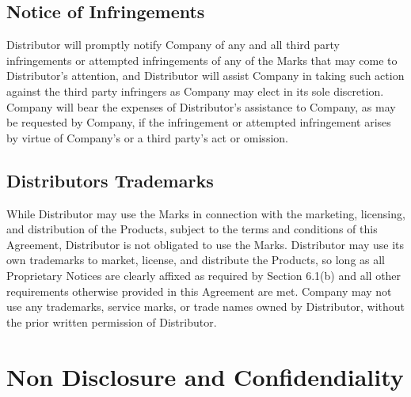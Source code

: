 \documentclass[letterpaper,10pt,english]{sphinxmanual}
\begin{document}
\subsection{Notice of Infringements}
\label{\detokenize{trademarks:notice-of-infringements}}
Distributor will promptly notify Company of any and all third party infringements or attempted infringements of any of the Marks that may come to Distributor’s attention, and Distributor will assist Company in taking such action against the third party infringers as Company may elect in its sole discretion. Company will bear the expenses of Distributor’s assistance to Company, as may be requested by Company, if the infringement or attempted infringement arises by virtue of Company’s or a third party’s act or omission.


\subsection{Distributors Trademarks}
\label{\detokenize{trademarks:distributors-trademarks}}
While Distributor may use the Marks in connection with the marketing, licensing, and distribution of the Products, subject to the terms and conditions of this Agreement, Distributor is not obligated to use the Marks. Distributor may use its own trademarks to market, license, and distribute the Products, so long as all Proprietary Notices are clearly affixed as required by Section 6.1(b) and all other requirements otherwise provided in this Agreement are met. Company may not use any trademarks, service marks, or trade names owned by Distributor, without the prior written permission of Distributor.


\section{Non Disclosure and Confidendiality}
\label{\detokenize{nondisclosure:non-disclosure-and-confidendiality}}\label{\detokenize{nondisclosure::doc}}
\end{document}
